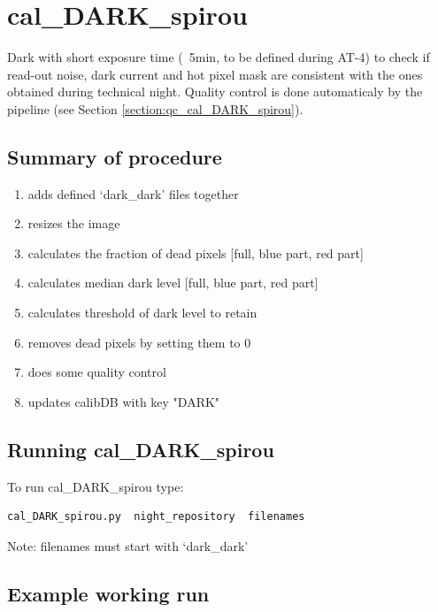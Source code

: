 \section{cal\_DARK\_spirou}
\label{section:cal_DARK_spirou}

Dark with short exposure time (~5min, to be defined during AT-4) to check if read-out noise, dark current and hot pixel mask are consistent with the ones obtained during technical night. Quality control is done automaticaly by the pipeline (see Section \ref{section:qc_cal_DARK_spirou}). \\


\subsection{Summary of procedure}
\begin{enumerate}
\item adds defined `dark\_dark' files together
\item resizes the image
\item calculates the fraction of dead pixels [full, blue part, red part]
\item calculates median dark level [full, blue part, red part]
\item calculates threshold of dark level to retain
\item removes dead pixels by setting them to 0
\item does some quality control
\item updates calibDB with key "DARK"
\end{enumerate}

\subsection{Running cal\_DARK\_spirou}

To run cal\_DARK\_spirou type:
\begin{lstlisting}[language=bash, style=bashstyle]
cal_DARK_spirou.py  night_repository  filenames
\end{lstlisting}

\noindent Note: filenames must start with `dark\_dark'

\subsection{Example working run}

